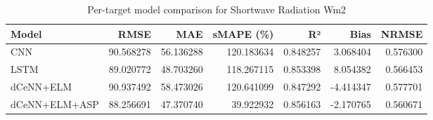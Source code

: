 \begin{table}
\caption{Per-target model comparison for Shortwave Radiation Wm2}
\begin{tabular}{lrrrrrr}
\toprule
Model & RMSE & MAE & sMAPE (\%) & R² & Bias & NRMSE \\
\midrule
CNN & 90.568278 & 56.136288 & 120.183634 & 0.848257 & 3.068404 & 0.576300 \\
LSTM & 89.020772 & 48.703260 & 118.267115 & 0.853398 & 8.054382 & 0.566453 \\
dCeNN+ELM & 90.937492 & 58.473026 & 120.641099 & 0.847292 & -4.414347 & 0.577701 \\
dCeNN+ELM+ASP & 88.256691 & 47.370740 & 39.922932 & 0.856163 & -2.170765 & 0.560671 \\
\bottomrule
\end{tabular}
\end{table}
